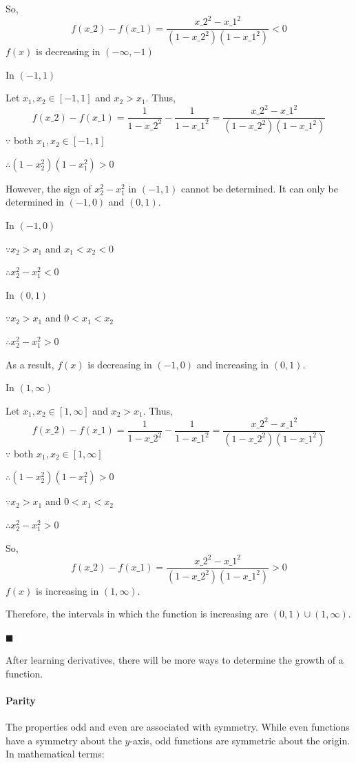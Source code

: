 So,
$$
f(x\_2) - f(x\_1) = \frac{x\_2^2 - x\_1^2}{(1 - x\_2^2)(1 - x\_1^2)} < 0
$$
$f(x)$ is decreasing in $(-\infty, -1)$

In $(-1, 1)$

Let $x_1, x_2 \in [-1, 1]$ and $x_2 > x_1$. Thus,
$$
f(x\_2) - f(x\_1) = \frac{1}{1 - x\_2^2} - \frac{1}{1 - x\_1^2} = \frac{x\_2^2 - x\_1^2}{(1 - x\_2^2)(1 - x\_1^2)}
$$
$\because$ both $x_1, x_2 \in [-1, 1]$

$\therefore (1 - x_2^2)(1 - x_1^2) > 0$

However, the sign of $x_2^2 - x_1^2$ in $(-1, 1)$ cannot be determined. It can only be determined in $(-1, 0)$ and $(0, 1)$.

In $(-1, 0)$

$\because x_2 > x_1$ and $x_1 < x_2 < 0$

$\therefore x_2^2 - x_1^2 < 0$

In $(0, 1)$

$\because x_2 > x_1$ and $0 < x_1 < x_2$

$\therefore x_2^2 - x_1^2 > 0$

As a result, $f(x)$ is decreasing in $(-1, 0)$ and increasing in $(0, 1)$.

In $(1, \infty)$

Let $x_1, x_2 \in [1, \infty]$ and $x_2 > x_1$. Thus,
$$
f(x\_2) - f(x\_1) = \frac{1}{1 - x\_2^2} - \frac{1}{1 - x\_1^2} = \frac{x\_2^2 - x\_1^2}{(1 - x\_2^2)(1 - x\_1^2)}
$$
$\because$ both $x_1, x_2 \in [1, \infty]$

$\therefore (1 - x_2^2)(1 - x_1^2) > 0$

$\because x_2 > x_1$ and $0 < x_1 < x_2$

$\therefore x_2^2 - x_1^2 > 0$

So,
$$
f(x\_2) - f(x\_1) = \frac{x\_2^2 - x\_1^2}{(1 - x\_2^2)(1 - x\_1^2)} > 0
$$
$f(x)$ is increasing in $(1, \infty)$.

Therefore, the intervals in which the function is increasing are $(0, 1) \cup (1, \infty)$.

$\blacksquare$

After learning derivatives, there will be more ways to determine the growth of a function.

\paragraph{Parity}

The properties odd and even are associated with symmetry. While even functions have a symmetry about the $y$-axis, odd functions are symmetric about the origin. In mathematical terms:

